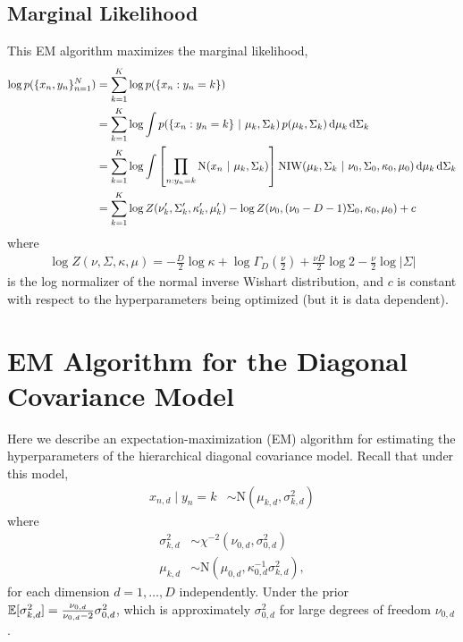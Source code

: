 \subsection{Marginal Likelihood}
This EM algorithm maximizes the marginal likelihood,
\begin{align*}
    \log p(\{x_n, y_n\}_{n=1}^N)
    &= \sum_{k=1}^K \log p(\{x_n: y_n =k\})  \\
    &= \sum_{k=1}^K \log \int p(\{x_n: y_n=k\} ~\vert~ \mu_k, \Sigma_k) \, p(\mu_k, \Sigma_k) \mathop{}\!\mathrm{d} \mu_k \mathop{}\!\mathrm{d} \Sigma_k \\
    &= \sum_{k=1}^K \log \int \left[\prod_{n:y_n=k} \mathrm{N}(x_n ~\vert~ \mu_k, \Sigma_k) \right] \mathrm{NIW}(\mu_k, \Sigma_k ~\vert~ \nu_0, \Sigma_0, \kappa_0, \mu_0) \mathop{}\!\mathrm{d} \mu_k \mathop{}\!\mathrm{d} \Sigma_k \\
    &= \sum_{k=1}^K \log Z(\nu_k', \Sigma_k', \kappa_k', \mu_k') - \log Z(\nu_0, (\nu_0 - D - 1) \Sigma_0, \kappa_0, \mu_0) + c
\end{align*}
where
\begin{align*}
    \log Z(\nu, \Sigma, \kappa, \mu) = -\tfrac{D}{2} \log \kappa + \log \Gamma_D(\tfrac{\nu}{2}) + \tfrac{\nu D}{2}\log 2  - \tfrac{\nu}{2} \log |\Sigma|
\end{align*}
is the log normalizer of the normal inverse Wishart distribution, and $c$ is constant with respect to the hyperparameters being optimized (but it is data dependent).


\section{EM Algorithm for the Diagonal Covariance Model}
\label{app:em-diag-hdpmm}
Here we describe an expectation-maximization (EM) algorithm for estimating the hyperparameters of the hierarchical diagonal covariance model. Recall that under this model,
\begin{align*}
    x_{n,d} \mid y_n=k &\sim \mathrm{N}(\mu_{k,d}, \sigma_{k,d}^2)
\end{align*}
where
\begin{align*}
    \sigma_{k,d}^2 &\sim \chi^{-2}(\nu_{0,d}, \sigma_{0,d}^2) \\
    \mu_{k,d} &\sim \mathrm{N}(\mu_{0,d}, \kappa_{0,d}^{-1} \sigma_{k,d}^2),
\end{align*}
for each dimension $d=1,\ldots,D$ independently.
Under the prior $\mathbb{E}[\sigma_{k,d}^2] = \frac{\nu_{0,d}}{\nu_{0,d} - 2} \sigma_{0,d}^2$, which is approximately $\sigma_{0,d}^2$ for large degrees of freedom $\nu_{0,d}$.

